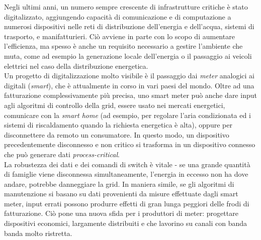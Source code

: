 Negli ultimi anni, un numero sempre crescente di infrastrutture critiche è stato digitalizzato, aggiungendo capacità di comunicazione e di computazione a numerosi dispositivi nelle reti di distribuzione dell'energia e dell'acqua, sistemi di trasporto, e manifatturieri. Ciò avviene in parte con lo scopo di aumentare l'efficienza, ma spesso è anche un requisito necessario a gestire l'ambiente che muta, come ad esempio la generazione locale dell'energia o il passaggio ai veicoli elettrici nel caso della distribuzione energetica.\\
Un progetto di digitalizzazione molto visibile è il passaggio dai \emph{meter} analogici ai digitali (\emph{smart}), che è attualmente in corso in vari paesi del mondo. Oltre ad una fatturazione complessivamente più precisa, uno smart meter può anche dare input agli algoritmi di controllo della grid, essere usato nei mercati energetici, comunicare con la \emph{smart home} (ad esempio, per regolare l'aria condizionata ed i sistemi di riscaldamento quando la richiesta energetica è alta), oppure per disconnettere da remoto un consumatore. In questo modo, un dispositivo precedentemente disconnesso e non critico si trasforma in un dispositivo connesso che può generare dati \emph{process-critical}.\\
La robustezza dei dati e dei comandi di switch è vitale - se una grande quantità di famiglie viene disconnessa simultaneamente, l'energia in eccesso non ha dove andare, potrebbe danneggiare la grid. In maniera simile, se gli algoritmi di manutenzione si basano su dati provenienti da misure effettuate dagli smart meter, input errati possono produrre effetti di gran lunga peggiori delle frodi di fatturazione. Ciò pone una nuova sfida per i produttori di meter: progettare dispositivi economici, largamente distribuiti e che lavorino su canali con banda banda molto ristretta.

